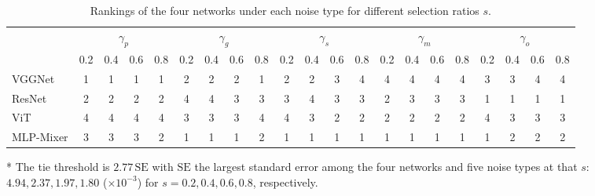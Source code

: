 \begin{table}[htbp]
		\caption{Rankings of the four networks under each noise type for different selection ratios $s$.}
		\label{tab:rank_s_own}
		\centering
		\setlength{\tabcolsep}{4pt}
		\begin{threeparttable}
			\begin{tabular}{l*{20}{c}}
				\toprule
				\multicolumn{1}{c}{} & \multicolumn{4}{c}{$\gamma_p$} & \multicolumn{4}{c}{$\gamma_g$} & \multicolumn{4}{c}{$\gamma_s$} & \multicolumn{4}{c}{$\gamma_m$} & \multicolumn{4}{c}{$\gamma_o$} \\
				\cmidrule(lr){2-5} \cmidrule(lr){6-9} \cmidrule(lr){10-13} \cmidrule(lr){14-17} \cmidrule(lr){18-21}
				\multicolumn{1}{c}{} & 0.2 & 0.4 & 0.6 & 0.8 & 0.2 & 0.4 & 0.6 & 0.8 & 0.2 & 0.4 & 0.6 & 0.8 & 0.2 & 0.4 & 0.6 & 0.8 & 0.2 & 0.4 & 0.6 & 0.8 \\
				\midrule
				VGGNet & 1 & 1 & 1 & 1 & 2 & 2 & 2 & 1 & 2 & 2 & 3 & 4 & 4 & 4 & 4 & 4 & 3 & 3 & 4 & 4 \\
				ResNet & 2 & 2 & 2 & 2 & 4 & 4 & 3 & 3 & 3 & 4 & 3 & 3 & 2 & 3 & 3 & 3 & 1 & 1 & 1 & 1 \\
				ViT & 4 & 4 & 4 & 4 & 3 & 3 & 3 & 4 & 4 & 3 & 2 & 2 & 2 & 2 & 2 & 2 & 4 & 3 & 3 & 3 \\
				MLP-Mixer & 3 & 3 & 3 & 2 & 1 & 1 & 1 & 2 & 1 & 1 & 1 & 1 & 1 & 1 & 1 & 1 & 1 & 2 & 2 & 2 \\
				\bottomrule
			\end{tabular}
			\begin{tablenotes}
				\footnotesize
				\item[*] The tie threshold is $2.77\,\mathrm{SE}$ with $\mathrm{SE}$ the largest standard error among the four networks and five noise types at that $s$: $4.94, 2.37, 1.97, 1.80$ ($\times 10^{-3}$) for $s = 0.2, 0.4, 0.6, 0.8$, respectively.
			\end{tablenotes}
		\end{threeparttable}
	\end{table}
